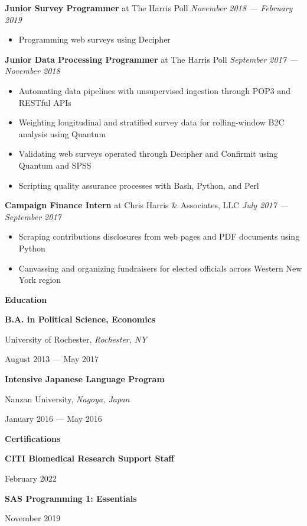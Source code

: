 \documentclass[12pt]{article}
\begin{document}
\noindent \textbf{Junior Survey Programmer} at The Harris Poll \hfill \textit{November 2018 --- February 2019}
\begin{itemize}[]
\item Programming web surveys using Decipher
\end{itemize}

\noindent \textbf{Junior Data Processing Programmer} at The Harris Poll \hfill \textit{September 2017 --- November 2018}
\begin{itemize}[]
\item Automating data pipelines with unsupervised ingestion through POP3 and RESTful APIs
\item Weighting longitudinal and stratified survey data for rolling-window B2C analysis using Quantum
\item Validating web surveys operated through Decipher and Confirmit using Quantum and SPSS
\item Scripting quality assurance processes with Bash, Python, and Perl
\end{itemize}

\noindent \textbf{Campaign Finance Intern} at Chris Harris \& Associates, LLC \hfill \textit{July 2017 --- September 2017}
\begin{itemize}[]
\item Scraping contributions disclosures from web pages and PDF documents using Python
\item Canvassing and organizing fundraisers for elected officials across Western New York region
\end{itemize}

\large
\noindent \textbf{Education} \hrulefill
\normalsize

\begin{multicols}{2}[]
\noindent \textbf{B.A. in Political Science, Economics} \par
University of Rochester, \textit{Rochester, NY} \par
August 2013 --- May 2017

\noindent \textbf{Intensive Japanese Language Program} \par
Nanzan University, \textit{Nagoya, Japan} \par
January 2016 --- May 2016
\end{multicols}

\large
\noindent \textbf{Certifications} \hrulefill
\normalsize

\begin{multicols}{2}[]
\noindent \textbf{CITI Biomedical Research Support Staff} \par
February 2022

\noindent \textbf{SAS Programming 1: Essentials} \par
November 2019
\end{multicols}
\end{document}
